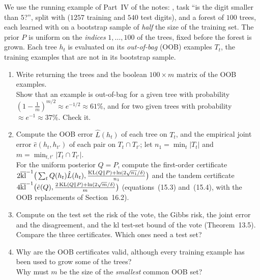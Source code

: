 \documentclass[a4paper,11pt]{article}
\begin{document}
\label{p5:oob}

We use the running example of Part~IV of the notes: , task ``is the digit smaller than $5$?'', split with
 ($1257$ training and $540$ test digits), and a forest of
$100$ trees, each learned with  on a bootstrap sample of \emph{half}
the size of the training set. The prior $P$ is uniform on the \emph{indices} $1,\dots,100$ of the trees, fixed before
the forest is grown. Each tree $h_t$ is evaluated on its \emph{out-of-bag} (OOB) examples $T_t$, the training examples
that are not in its bootstrap sample.

\begin{enumerate}
\item Write  returning the trees and the boolean $100\times m$ matrix
      of the OOB examples.\\
      Show that an example is out-of-bag for a given tree with probability $(1-\frac1m)^{m/2}\approx e^{-1/2}\approx61\%$,
      and for two given trees with probability $\approx e^{-1}\approx37\%$. Check it.
\item Compute the OOB error $\hat L(h_t)$ of each tree on $T_t$, and the empirical joint error $\hat e(h_t,h_{t'})$ of each
      pair on $T_t\cap T_{t'}$; let $n_1=\min_t|T_t|$ and $m=\min_{t,t'}|T_t\cap T_{t'}|$.\\
      For the uniform posterior $Q=P$, compute the first-order certificate
      $2\overline{\operatorname{kl}}^{-1}\big(\sum_tQ(h_t)\hat L(h_t),\frac{\operatorname{KL}(Q\|P)+\ln(2\sqrt{n_1}/\delta)}{n_1}\big)$ and the tandem certificate
      $4\overline{\operatorname{kl}}^{-1}\big(\hat e(Q),\frac{2\operatorname{KL}(Q\|P)+\ln(2\sqrt{m}/\delta)}{m}\big)$ (equations~(15.3) and~(15.4), with the OOB
      replacements of Section~16.2).
\item Compute on the test set the risk of the vote, the Gibbs risk, the joint error and the disagreement, and the kl
      test-set bound of the vote (Theorem~13.5).\\
      Compare the three certificates. Which ones need a test set?
\item Why are the OOB certificates valid, although every training example has been used to grow some of the trees?\\
      Why must $m$ be the size of the \emph{smallest} common OOB set?
\end{enumerate}
\end{document}
